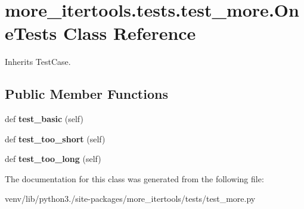 \hypertarget{classmore__itertools_1_1tests_1_1test__more_1_1_one_tests}{}\section{more\+\_\+itertools.\+tests.\+test\+\_\+more.\+One\+Tests Class Reference}
\label{classmore__itertools_1_1tests_1_1test__more_1_1_one_tests}


Inherits Test\+Case.

\subsection*{Public Member Functions}
\begin{DoxyCompactItemize}
\item 
\mbox{\label{classmore__itertools_1_1tests_1_1test__more_1_1_one_tests_a4cd24654dec7e7ca9de2315c45db2e66}} 
def {\bfseries test\+\_\+basic} (self)
\item 
\mbox{\label{classmore__itertools_1_1tests_1_1test__more_1_1_one_tests_adecb130842efd1484d1ea23782ffa7d5}} 
def {\bfseries test\+\_\+too\+\_\+short} (self)
\item 
\mbox{\label{classmore__itertools_1_1tests_1_1test__more_1_1_one_tests_aa223cb165df85a76314bb42304f3cda1}} 
def {\bfseries test\+\_\+too\+\_\+long} (self)
\end{DoxyCompactItemize}


The documentation for this class was generated from the following file\+:\begin{DoxyCompactItemize}
\item 
venv/lib/python3./site-\/packages/more\+\_\+itertools/tests/test\+\_\+more.\+py\end{DoxyCompactItemize}
